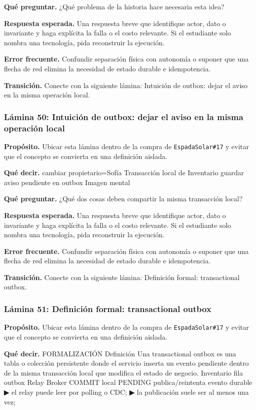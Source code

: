 \documentclass[variant=docente,cover=institutional,mode=screen]{ua-engineering-v6-article}
\begin{document}
\textbf{Qué preguntar.} ¿Qué problema de la historia hace necesaria esta idea?

\textbf{Respuesta esperada.} Una respuesta breve que identifique actor, dato o invariante y haga explícita la falla o el costo relevante. Si el estudiante solo nombra una tecnología, pida reconstruir la ejecución.

\textbf{Error frecuente.} Confundir separación física con autonomía o suponer que una flecha de red elimina la necesidad de estado durable e idempotencia.

\textbf{Transición.} Conecte con la siguiente lámina: Intuición de outbox: dejar el aviso en la misma operación local.

\subsubsection*{Lámina 50: Intuición de outbox: dejar el aviso en la misma operación local}
\textbf{Propósito.} Ubicar esta lámina dentro de la compra de \texttt{EspadaSolar\#17} y evitar que el concepto se convierta en una definición aislada.

\textbf{Qué decir.} cambiar propietario=Sofía Transacción local de Inventario guardar aviso pendiente en outbox Imagen mental

\textbf{Qué preguntar.} ¿Qué dos cosas deben compartir la misma transacción local?

\textbf{Respuesta esperada.} Una respuesta breve que identifique actor, dato o invariante y haga explícita la falla o el costo relevante. Si el estudiante solo nombra una tecnología, pida reconstruir la ejecución.

\textbf{Error frecuente.} Confundir separación física con autonomía o suponer que una flecha de red elimina la necesidad de estado durable e idempotencia.

\textbf{Transición.} Conecte con la siguiente lámina: Definición formal: transactional outbox.

\subsubsection*{Lámina 51: Definición formal: transactional outbox}
\textbf{Propósito.} Ubicar esta lámina dentro de la compra de \texttt{EspadaSolar\#17} y evitar que el concepto se convierta en una definición aislada.

\textbf{Qué decir.} FORMALIZACIÓN Definición Una transactional outbox es una tabla o colección persistente donde el servicio inserta un evento pendiente dentro de la misma transacción local que modifica el estado de negocio. Inventario fila outbox Relay Broker COMMIT local PENDING publica/reintenta evento durable ▶ el relay puede leer por polling o CDC; ▶ la publicación suele ser al menos una vez;
\end{document}

